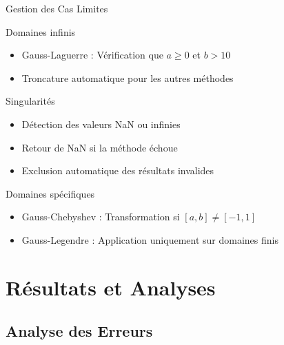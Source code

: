 \documentclass[aspectratio=169,11pt]{beamer}
\begin{document}
\begin{frame}{Gestion des Cas Limites}
\vspace{-0.2cm}
\begin{block}{Domaines infinis}
\small
\begin{itemize}
\item Gauss-Laguerre : Vérification que $a \geq 0$ et $b > 10$
\item Troncature automatique pour les autres méthodes
\end{itemize}
\end{block}

\vspace{-0.15cm}
\begin{block}{Singularités}
\small
\begin{itemize}
\item Détection des valeurs NaN ou infinies
\item Retour de NaN si la méthode échoue
\item Exclusion automatique des résultats invalides
\end{itemize}
\end{block}

\vspace{-0.15cm}
\begin{block}{Domaines spécifiques}
\small
\begin{itemize}
\item Gauss-Chebyshev : Transformation si $[a,b] \neq [-1,1]$
\item Gauss-Legendre : Application uniquement sur domaines finis
\end{itemize}
\end{block}
\end{frame}

\section{Résultats et Analyses}

\subsection{Analyse des Erreurs}
\end{document}
